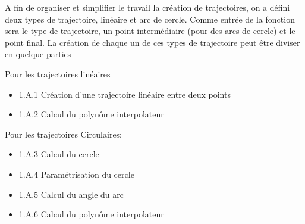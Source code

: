 
A fin de organiser et simplifier le travail la création de trajectoires, on a défini deux types de trajectoire, linéaire et arc de cercle. Comme entrée de la fonction sera le type de trajectoire, un point intermédiaire (pour des arcs de cercle) et le point final. La création de chaque un de ces types de trajectoire peut être diviser en quelque parties 

Pour les trajectoires linéaires 

\begin{itemize}
	\item 1.A.1 Création d'une trajectoire linéaire entre deux points
	 \item  1.A.2  Calcul du polynôme interpolateur 
\end{itemize}

Pour les trajectoires Circulaires:


\begin{itemize}
	\item 1.A.3 Calcul du cercle
	\item  1.A.4 Paramétrisation du cercle
	 \item 1.A.5 Calcul du angle du arc
	 \item 1.A.6 Calcul du polynôme interpolateur 
\end{itemize}

